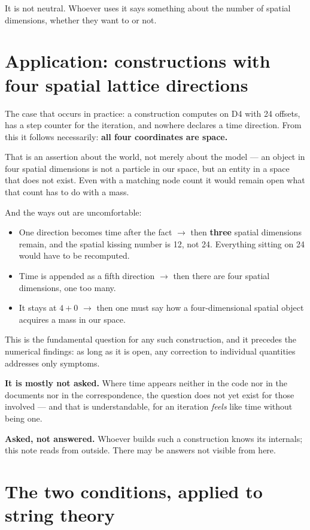 \documentclass[11pt]{report}
\begin{document}
It is not neutral. Whoever uses it says something about the number of
spatial dimensions, whether they want to or not.

\chapter{Application: constructions with four spatial lattice
directions}

The case that occurs in practice: a construction computes on D4 with 24
offsets, has a step counter for the iteration, and nowhere declares a
time direction. From this it follows necessarily: \textbf{all four
coordinates are space.}

That is an assertion about the world, not merely about the model --- an
object in four spatial dimensions is not a particle in our space, but
an entity in a space that does not exist. Even with a matching node
count it would remain open what that count has to do with a mass.

And the ways out are uncomfortable:
\begin{itemize}
\item One direction becomes time after the fact $\to$ then
  \textbf{three} spatial dimensions remain, and the spatial kissing
  number is 12, not 24. Everything sitting on 24 would have to be
  recomputed.
\item Time is appended as a fifth direction $\to$ then there are four
  spatial dimensions, one too many.
\item It stays at $4+0$ $\to$ then one must say how a four-dimensional
  spatial object acquires a mass in our space.
\end{itemize}

This is the fundamental question for any such construction, and it
precedes the numerical findings: as long as it is open, any correction
to individual quantities addresses only symptoms.

\textbf{It is mostly not asked.} Where time appears neither in the code
nor in the documents nor in the correspondence, the question does not
yet exist for those involved --- and that is understandable, for an
iteration \emph{feels} like time without being one.

\textbf{Asked, not answered.} Whoever builds such a construction knows
its internals; this note reads from outside. There may be answers not
visible from here.

\chapter{The two conditions, applied to string theory}
\end{document}
